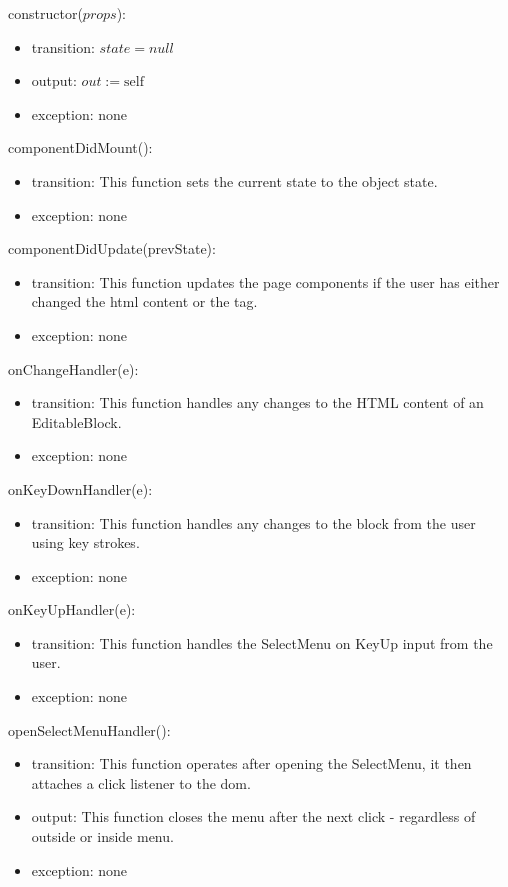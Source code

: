 \documentclass[12pt, titlepage]{article}
\begin{document}
\noindent constructor($props$):
\begin{itemize}
\item transition: $\mathit{state} = null $
\item output: $out := \mbox{self}$
\item exception: none
\end{itemize}

\noindent componentDidMount():
\begin{itemize}
\item transition: This function sets the current state to the object state.
\item exception: none
\end{itemize}

\noindent componentDidUpdate(prevState):
\begin{itemize}
\item transition: This function updates the page components if the user has either changed the html content or the tag.
\item exception: none
\end{itemize}

\noindent onChangeHandler(e):
\begin{itemize}
\item transition: This function handles any changes to the HTML content of an EditableBlock.
\item exception: none
\end{itemize}

\noindent onKeyDownHandler(e):
\begin{itemize}
\item transition: This function handles any changes to the block from the user using key strokes.
\item exception: none
\end{itemize}

\noindent onKeyUpHandler(e):
\begin{itemize}
\item transition: This function handles the SelectMenu on KeyUp input from the user.
\item exception: none
\end{itemize}

\noindent openSelectMenuHandler():
\begin{itemize}
\item transition: This function operates after opening the SelectMenu, it then attaches a click listener to the dom.
\item output: This function closes the menu after the next click - regardless of outside or inside menu.
\item exception: none
\end{itemize}
\end{document}
